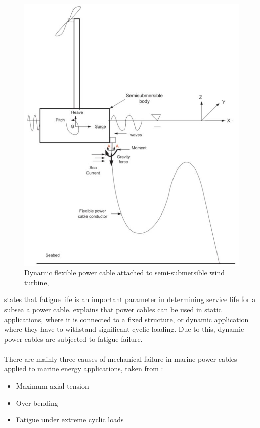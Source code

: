 \begin{figure}[H]
\centering
\includegraphics[scale=0.7]{figures/float}
\caption[$\; \:$Dynamic flexible power cable attached to semi-submersible wind turbine]{Dynamic flexible power cable attached to semi-submersible wind turbine, \cite{Nasution2013}}
 \label{fig:float}
\end{figure}
\noindent \cite{YangShun-Han2017} states that fatigue life is an important parameter in determining service life for a subsea a power cable. \cite{Thies2012} explains that power cables can be used in static applications, where it is connected to a fixed structure, or dynamic application where they have to withstand significant cyclic loading. Due to this, dynamic power cables are subjected to fatigue failure.\\\\
There are mainly three causes of mechanical failure in marine power cables applied to marine energy applications, taken from \cite{Thies2012}:

\begin{itemize}
    \item Maximum axial tension
    \item Over bending
    \item Fatigue under extreme cyclic loads
\end{itemize}

